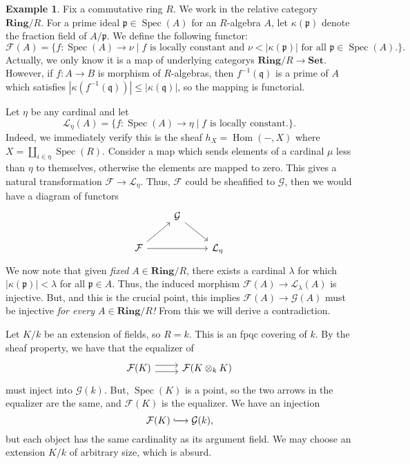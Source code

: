 \documentclass{amsart}
\newcommand{\Ring}{\mathbf{Ring}}
\newcommand{\Set}{\mathbf{Set}}
\DeclareMathOperator{\Spec}{Spec}
\DeclareMathOperator{\Hom}{Hom}
\theoremstyle{definition}
\newtheorem{example}[theorem]{Example}
\theoremstyle{remark}
\newcommand{\abs}[1] {
  \left| #1 \right|}
\begin{document}
\begin{example}
    Fix a commutative ring $R$. We work in the relative category $\Ring/R$. For
    a prime ideal $\mathfrak{p} \in \Spec(A)$ for an $R$-algebra $A$, let
    $\kappa(\mathfrak{p})$ denote the fraction field of $A/\mathfrak{p}$. We
    define the following functor:
    \[
        \mathcal{F}(A) = \bigg\{ f : \Spec(A) \to \nu \mid \text{$f$ is locally
                constant and $\nu < \abs{\kappa(\mathfrak{p})}$ for all
                $\mathfrak{p} \in \Spec(A)$.} \bigg\}.
    \]
    Actually, we only know it is a map of underlying categorys $\Ring/R \to
    \Set$. However, if $f : A \to B$ is morphism of
    $R$-algebras, then $f^{-1}(\mathfrak{q})$ is a prime of $A$ which satisfies
    $\abs{\kappa(f^{-1}(\mathfrak{q}))} \leq \abs{\kappa(\mathfrak{q})}$, so the
    mapping is functorial.

    Let $\eta$ be any cardinal and let
    \[
        \mathcal{L}_{\eta}(A) = \bigg\{ f : \Spec(A) \to \eta \mid \text{$f$ is
            locally constant.} \bigg\}.
    \]
    Indeed, we immediately verify this is the sheaf $h_X = \Hom({-}, X)$ where
    $X = \coprod_{i \in \eta} \Spec(R)$. Consider a map which sends elements of
    a cardinal $\mu$ less than $\eta$ to themselves, otherwise the elements are
    mapped to zero. This gives a natural transformation $\mathcal{F} \to
    \mathcal{L}_{\eta}$. Thus, $\mathcal{F}$ could be sheafified to
    $\mathcal{G}$, then we would have a diagram of functors
    \[
        \begin{tikzcd}
            & \mathcal{G} \ar[dr] \\
            \mathcal{F} \ar[ur] \ar[rr] & & \mathcal{L}_{\eta}
        \end{tikzcd}
    \]
    We now note that given \textit{fixed} $A \in \Ring/R$, there exists a
    cardinal $\lambda$ for which $\abs{\kappa(\mathfrak{p})} < \lambda$ for all
    $\mathfrak{p} \in A$. Thus, the induced morphism $\mathcal{F}(A) \to
    \mathcal{L}_{\lambda}(A)$ is injective. But, and this is the crucial
    point, this implies $\mathcal{F}(A) \to \mathcal{G}(A)$ must be injective
    \textit{for every $A \in \Ring/R$!} From this we will derive a
    contradiction.

    Let $K/k$ be an extension of fields, so $R=k$. This is an fpqc covering of
    $k$. By the sheaf property, we have that the equalizer of
    \[
        \begin{tikzcd}
            \mathcal{F}(K) \ar[r, shift left=0.75ex] \ar[r, shift right=0.75ex]
            & \mathcal{F}(K \otimes_k K)
        \end{tikzcd}
    \]
    must inject into $\mathcal{G}(k)$. But, $\Spec(K)$ is a point, so the two
    arrows in the equalizer are the same, and $\mathcal{F}(K)$ is the equalizer.
    We have an injection
    \[
        \mathcal{F}(K) \xhookrightarrow{\quad} \mathcal{G}(k),
    \]
    but each object has the same cardinality as its argument field. We may
    choose an extension $K/k$ of arbitrary size, which is absurd.
\end{example}
\end{document}
